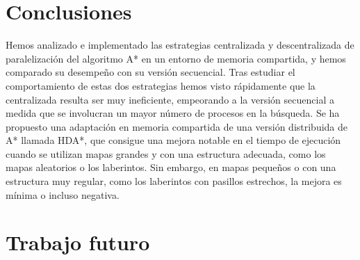 \documentclass[a4paper,12pt]{article}
\begin{document}
\newpage
\section{Conclusiones} \label{sec:conclusiones}

Hemos analizado e implementado las estrategias centralizada y descentralizada de paralelización del algoritmo A* en un entorno de memoria compartida, y hemos comparado su desempeño con su versión secuencial. Tras estudiar el comportamiento de estas dos estrategias hemos visto rápidamente que la centralizada resulta ser muy ineficiente, empeorando a la versión secuencial a medida que se involucran un mayor número de procesos en la búsqueda. Se ha propuesto una adaptación en memoria compartida de una versión distribuida de A* llamada HDA*, que consigue una mejora notable en el tiempo de ejecución cuando se utilizan mapas grandes y con una estructura adecuada, como los mapas aleatorios o los laberintos. Sin embargo, en mapas pequeños o con una estructura muy regular, como los laberintos con pasillos estrechos, la mejora es mínima o incluso negativa.

\newpage

\section{Trabajo futuro} \label{sec:futuro}

\newpage






\appendix
\end{document}
